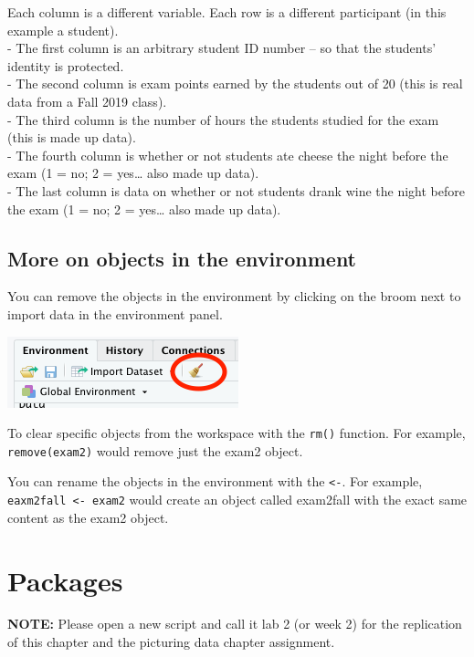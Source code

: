 \documentclass[
]{book}
\begin{document}
Each column is a different variable. Each row is a different participant (in this example a student).\\
- The first column is an arbitrary student ID number -- so that the students' identity is protected.\\
- The second column is exam points earned by the students out of 20 (this is real data from a Fall 2019 class).\\
- The third column is the number of hours the students studied for the exam (this is made up data).\\
- The fourth column is whether or not students ate cheese the night before the exam (1 = no; 2 = yes\ldots{} also made up data).\\
- The last column is data on whether or not students drank wine the night before the exam (1 = no; 2 = yes\ldots{} also made up data).

\hypertarget{more-on-objects-in-the-environment}{%
\section{More on objects in the environment}\label{more-on-objects-in-the-environment}}

You can remove the objects in the environment by clicking on the broom next to import data in the environment panel.

\includegraphics{img/broom.png}

To clear specific objects from the workspace with the \texttt{rm()} function. For example, \texttt{remove(exam2)} would remove just the exam2 object.

You can rename the objects in the environment with the \texttt{\textless{}-}. For example, \texttt{eaxm2fall\ \textless{}-\ exam2} would create an object called exam2fall with the exact same content as the exam2 object.

\hypertarget{packages}{%
\chapter{Packages}\label{packages}}

\textbf{NOTE:} Please open a new script and call it lab 2 (or week 2) for the replication of this chapter and the picturing data chapter assignment.
\end{document}
